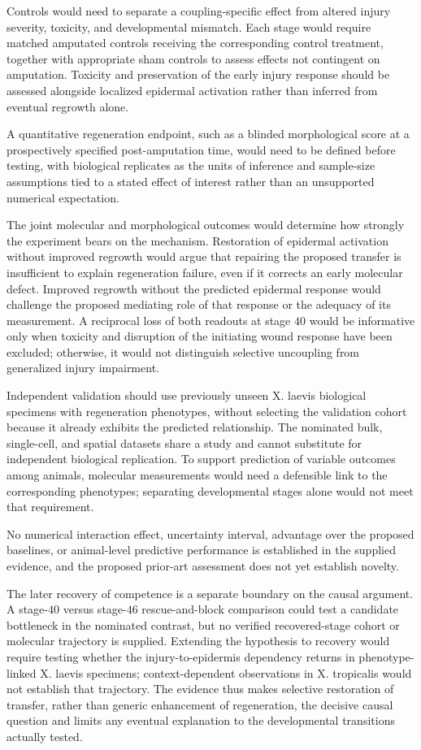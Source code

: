 \documentclass[11pt]{article}
\begin{document}
Controls would need to separate a coupling-specific effect from altered injury severity, toxicity, and developmental mismatch. Each stage would require matched amputated controls receiving the corresponding control treatment, together with appropriate sham controls to assess effects not contingent on amputation. Toxicity and preservation of the early injury response should be assessed alongside localized epidermal activation rather than inferred from eventual regrowth alone.

A quantitative regeneration endpoint, such as a blinded morphological score at a prospectively specified post-amputation time, would need to be defined before testing, with biological replicates as the units of inference and sample-size assumptions tied to a stated effect of interest rather than an unsupported numerical expectation.

The joint molecular and morphological outcomes would determine how strongly the experiment bears on the mechanism. Restoration of epidermal activation without improved regrowth would argue that repairing the proposed transfer is insufficient to explain regeneration failure, even if it corrects an early molecular defect. Improved regrowth without the predicted epidermal response would challenge the proposed mediating role of that response or the adequacy of its measurement. A reciprocal loss of both readouts at stage $40$ would be informative only when toxicity and disruption of the initiating wound response have been excluded; otherwise, it would not distinguish selective uncoupling from generalized injury impairment.

Independent validation should use previously unseen X. laevis biological specimens with regeneration phenotypes, without selecting the validation cohort because it already exhibits the predicted relationship. The nominated bulk, single-cell, and spatial datasets share a study and cannot substitute for independent biological replication. To support prediction of variable outcomes among animals, molecular measurements would need a defensible link to the corresponding phenotypes; separating developmental stages alone would not meet that requirement.

No numerical interaction effect, uncertainty interval, advantage over the proposed baselines, or animal-level predictive performance is established in the supplied evidence, and the proposed prior-art assessment does not yet establish novelty.

The later recovery of competence is a separate boundary on the causal argument. A stage-$40$ versus stage-$46$ rescue-and-block comparison could test a candidate bottleneck in the nominated contrast, but no verified recovered-stage cohort or molecular trajectory is supplied. Extending the hypothesis to recovery would require testing whether the injury-to-epidermis dependency returns in phenotype-linked X. laevis specimens; context-dependent observations in X. tropicalis would not establish that trajectory. The evidence thus makes selective restoration of transfer, rather than generic enhancement of regeneration, the decisive causal question and limits any eventual explanation to the developmental transitions actually tested.
\end{document}
